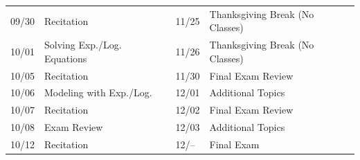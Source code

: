\documentclass[11pt,letterpaper]{article}
\begin{document}
\begin{table}[!ht]
{\begin{tabular}{ll || ll}
	09/30 & Recitation & 11/25 & Thanksgiving Break (No Classes) \\
	10/01 & Solving Exp./Log. Equations & 11/26 & Thanksgiving Break (No Classes) \\
	10/05 & Recitation & 11/30 & Final Exam Review \\
	10/06 & Modeling with Exp./Log. & 12/01 & Additional Topics \\
	10/07 & Recitation & 12/02 & Final Exam Review \\
	10/08 & Exam Review & 12/03 & Additional Topics \\
	10/12 & Recitation & 12/-- & Final Exam
        \end{tabular}
        }
        \end{table}





\newpage
\end{document}
